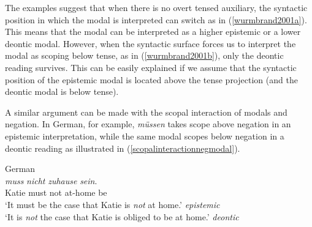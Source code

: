 %

\noindent The examples suggest that when there is no overt tensed auxiliary, the syntactic position in which the modal is interpreted can switch as in (\ref{wurmbrand2001a}). This means that the modal can be interpreted as a higher epistemic or a lower deontic modal. However, when the syntactic surface forces us to interpret the modal as scoping below tense, as in (\ref{wurmbrand2001b}), only the deontic reading survives. This can be easily explained if we assume that the syntactic position of the epistemic modal is located above the tense projection (and the deontic modal is below tense). 

A similar argument can be made with the scopal interaction of modals and negation. In German, for example, \textit{müssen} takes scope above negation in an epistemic interpretation, while the same modal scopes below negation in a deontic reading as illustrated in (\ref{scopalinteractionnegmodal}).

\begin{exe} 
\ex German \\  {\textit{muss}} {\textit{nicht}} {\textit{zuhause}} {\textit{sein}.} \\
{Katie} {must} {not} {at-home} {be} \\
\trans `It must be the case that Katie is \textit{not} at home.' \hfill{\textit{epistemic}}\label{scopalinteractionnegmodal} \\
`It is \textit{not} the case that Katie is obliged to be at home.' \hfill{\textit{deontic}}
\end{exe} 


